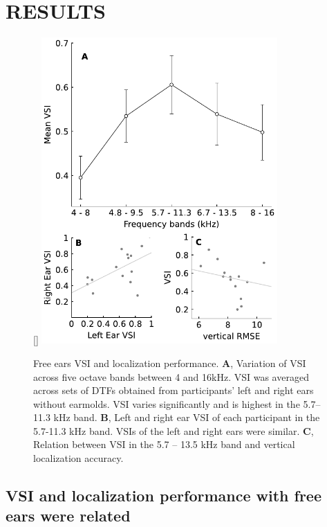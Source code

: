 \newpage\section{RESULTS}\label{sec3}%
\begin{figure}
\captionsetup{width=9cm}
\centering
    \raisebox{0pt}[\dimexpr{}\baselineskip\relax]{
        \includegraphics[width=9cm]{../Results/figures/fig2/fig2}}
	\caption{Free ears VSI and localization performance. \textbf{A}, Variation of VSI across five octave bands between 4 and 16kHz. VSI was averaged across sets of DTFs obtained from participants' left and right ears without earmolds. VSI varies significantly and is highest in the 5.7–11.3 kHz band.  \textbf{B}, Left and right ear VSI of each participant in the 5.7-11.3 kHz band. VSIs of the left and right ears were similar. \textbf{C}, Relation between VSI in the 5.7 – 13.5 kHz band and vertical localization accuracy.}
	\label{fig:ef_vsi}
\end{figure}
\noindent\vspace{-3\baselineskip}

\subsection{VSI and localization performance with free ears were related}

